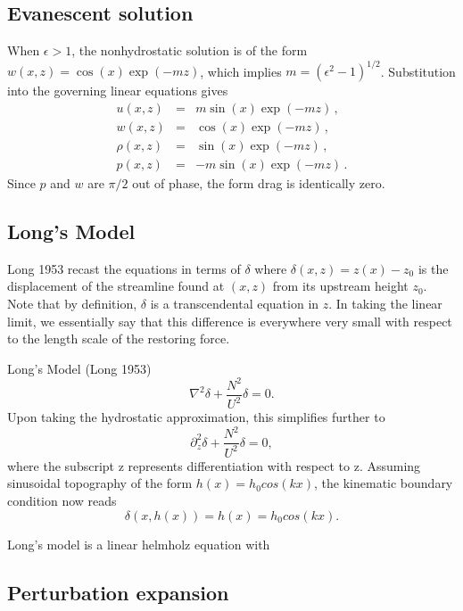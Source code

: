 \documentclass[12pt]{article}
\begin{document}
\subsection{Evanescent solution}

When $\epsilon>1$, the nonhydrostatic solution is of the form
$w(x,z) = \cos(x)\exp(-m z)$, which implies $m = (\epsilon^2-1)^{1/2}$.  Substitution into
the governing linear equations gives
\begin{eqnarray*}
u(x,z) &=& m \sin(x) \exp(-m z)\,,\\
w(x,z) &=& \cos(x) \exp(-m z)\,,\\
\rho(x,z) &=& \sin(x) \exp(-m z)\,,\\
p(x,z) &=& -m \sin(x) \exp(-m z)\,.
\end{eqnarray*}
Since $p$ and $w$ are $\pi/2$ out of phase, the form drag is identically zero.

\subsection{Long's Model}

Long 1953 recast the equations in terms of $\delta$ where $\delta(x,z) = z(x)-z_0$ is the displacement of the streamline found at $(x,z)$ from its upstream height $z_0$. Note that by definition, $\delta$ is a transcendental equation in $z$. In taking the linear limit, we essentially say that this difference is everywhere very small with respect to the length scale of the restoring force. 

Long's Model (Long 1953)
\[
\nabla^2\delta + \frac{N^2}{U^2}\delta = 0.
\]
Upon taking the hydrostatic approximation, this simplifies further to
\[
\partial_z^2\delta +  \frac{N^2}{U^2}\delta = 0,
\]
where the subscript z represents differentiation with respect to z.
Assuming sinusoidal topography of the form $h(x) = h_0 cos(kx)$, the kinematic boundary condition now reads
\[
\delta(x,h(x)) = h(x) = h_0 cos(kx).
\]

Long's model is a linear helmholz equation with 

\subsection{Perturbation expansion}
\end{document}
